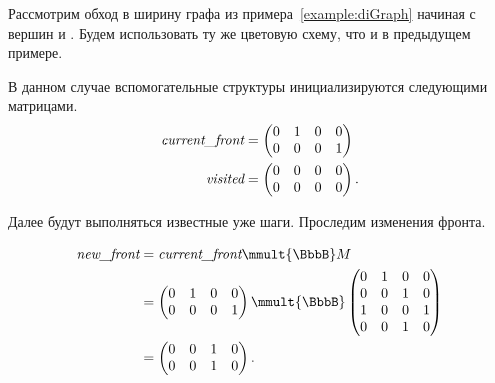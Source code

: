 \begin{example}
    Рассмотрим обход в ширину графа из примера~\ref{example:diGraph} начиная с вершин  и .
    Будем использовать ту же цветовую схему, что и в предыдущем примере.

    В данном случае вспомогательные структуры инициализируются следующими матрицами.
    \begin{align*}
        \emph{current\_front} & =
        \begin{pmatrix}
            0 & 1 & 0 & 0 \\
            0 & 0 & 0 & 1
        \end{pmatrix}
        \\
        \emph{visited}        & =
        \begin{pmatrix}
            0 & 0 & 0 & 0 \\
            0 & 0 & 0 & 0
        \end{pmatrix}.
    \end{align*}

    Далее будут выполняться известные уже шаги.
    Проследим изменения фронта.

    \begin{align*}
        \emph{new\_front} & = \emph{current\_front} \mmult{\BbbB} M \\
                          &=
        \begin{pmatrix}
            0 & 1 & 0 & 0 \\
            0 & 0 & 0 & 1
        \end{pmatrix} \mmult{\BbbB}
        \begin{pmatrix}
            0 & 1 & 0 & 0 \\
            0 & 0 & 1 & 0 \\
            1 & 0 & 0 & 1 \\
            0 & 0 & 1 & 0
        \end{pmatrix}        \\ &=
        \begin{pmatrix}
            0 & 0 & 1 & 0 \\
            0 & 0 & 1 & 0
        \end{pmatrix}.
    \end{align*}

    \begin{marginfigure}
        \begin{center}
            \resizebox{\marginparwidth}{!}{}
        \end{center}
        \caption{Обход в ширину с несколькими стартовыми вершинами, шаг первый}
        \label{fig:ms_bfs_step_1}
    \end{marginfigure}


\end{example}
